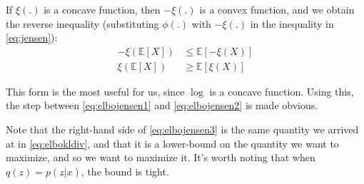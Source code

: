 If $\xi(.)$ is a concave function, then $- \xi(.)$ is a convex function, and we
obtain the reverse inequality (substituting $\phi(.)$ with $-\xi(.)$ in the
inequality in \ref{eq:jensen}):
\begin{align}
    -\xi(\mathbb{E}[X]) &\leq \mathbb{E}[-\xi(X)] \\
    \xi(\mathbb{E}[X]) &\geq \mathbb{E}[\xi(X)]
\end{align}

This form is the most useful for us, since $\log$ is a concave function. Using
this, the step between \ref{eq:elbojensen1} and \ref{eq:elbojensen2} is made
obvious.

Note that the right-hand side of \ref{eq:elbojensen3} is the same quantity
we arrived at in \ref{eq:elbokldiv}, and that it is a lower-bound on the
quantity we want to maximize, and so we want to maximize it. It's worth noting
that when $q(z) = p(z|x)$, the bound is tight.
